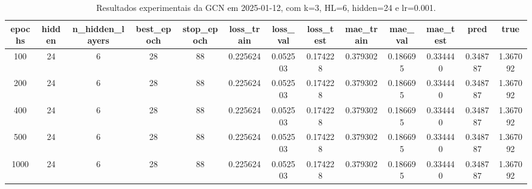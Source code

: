 \begin{table}[h]
\centering
\caption{Resultados experimentais da GCN em 2025-01-12, com k=3, HL=6, hidden=24 e lr=0.001.}
\label{tab:gcn_results_k3_hl6_h24_d20250112}
\begin{tabular}{ccccccccccccc}
\toprule
epochs & hidden & n\_hidden\_layers & best\_epoch & stop\_epoch & loss\_train & loss\_val & loss\_test & mae\_train & mae\_val & mae\_test & pred & true \\
\midrule
100 & 24 & 6 & 28 & 88 & 0.225624 & 0.052503 & 0.174228 & 0.379302 & 0.186695 & 0.334440 & 0.348787 & 1.367092 \\
200 & 24 & 6 & 28 & 88 & 0.225624 & 0.052503 & 0.174228 & 0.379302 & 0.186695 & 0.334440 & 0.348787 & 1.367092 \\
400 & 24 & 6 & 28 & 88 & 0.225624 & 0.052503 & 0.174228 & 0.379302 & 0.186695 & 0.334440 & 0.348787 & 1.367092 \\
500 & 24 & 6 & 28 & 88 & 0.225624 & 0.052503 & 0.174228 & 0.379302 & 0.186695 & 0.334440 & 0.348787 & 1.367092 \\
1000 & 24 & 6 & 28 & 88 & 0.225624 & 0.052503 & 0.174228 & 0.379302 & 0.186695 & 0.334440 & 0.348787 & 1.367092 \\
\bottomrule
\end{tabular}
\end{table}
